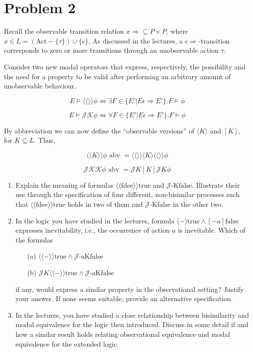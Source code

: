 \documentclass{article}
\begin{document}
\newpage





\section{Problem 2} Recall the observable transition relation \( x \Rightarrow \subseteq P \times P\), where \( x \in L = (\text{Act} - \{\tau\}) \cup \{\epsilon\}\).
As discussed in the lectures, a \(\epsilon \Rightarrow\)-transition corresponds to zero or more transitions through an unobservable action \(\tau\).

Consider two new modal operators that express, respectively, the possibility and the need for a property to be valid after performing an arbitrary amount of unobservable behaviour.

\[ E \models \langle\langle \rangle\rangle \phi \iff \exists F \in \{E' | E \epsilon \Rightarrow E'\}. F \models \phi \]

\[ E \models \mathcal{J}\mathcal{K}\phi \iff \forall F \in \{E' | E \epsilon \Rightarrow E'\}. F \models \phi \]

By abbreviation we can now define the “observable versions” of \(\langle K \rangle\) and \([K]\), for \( K \subseteq L \). Thus,

\[ \langle\langle K \rangle\rangle \phi \text{ abv } = \langle\langle \rangle\rangle \langle K \rangle \langle\langle \rangle\rangle \phi \]

\[ \mathcal{J}\mathcal{K}\mathcal{K}\phi \text{ abv } = \mathcal{J} K [K] \mathcal{J} K \phi \]

\begin{enumerate}
    \item Explain the meaning of formulas \(\langle\langle\text{fdee}\rangle\rangle \text{true}\) and \(\mathcal{J}\text{-Kfalse}\). Illustrate their use through the specification of four different, non-bisimilar processes such that \(\langle\langle\text{fdee}\rangle\rangle \text{true}\) holds in two of them and \(\mathcal{J}\text{-Kfalse}\) in the other two.
    \item In the logic you have studied in the lectures, formula
    \(\langle-\rangle\text{true} \wedge [-a]\text{false}\)
    expresses inevitability, i.e., the occurrence of action \(a\) is inevitable. Which of the formulas
    \begin{itemize}
        \item[(a)] \(\langle\langle-\rangle\rangle \text{true} \wedge \mathcal{J}\text{-aKfalse}\)
        \item[(b)] \(\mathcal{J} K \langle\langle-\rangle\rangle \text{true} \wedge \mathcal{J}\text{-aKfalse}\)
    \end{itemize}
    if any, would express a similar property in the observational setting? Justify your answer. If none seems suitable, provide an alternative specification.
    \item In the lectures, you have studied a close relationship between bisimilarity and modal equivalence for the logic then introduced. Discuss in some detail if and how a similar result holds relating observational equivalence and modal equivalence for the extended logic.
\end{enumerate}
\end{document}
